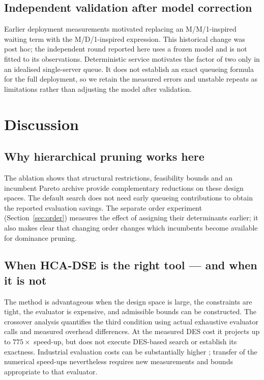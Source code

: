 \documentclass[preprint,11pt,3p]{elsarticle}
\theoremstyle{plain}
\theoremstyle{definition}
\newcommand{\ProjectionMax}{775}
\begin{document}
\FloatBarrier

\subsection{Independent validation after model correction}
Earlier deployment measurements motivated replacing an M/M/1-inspired waiting term
with the M/D/1-inspired expression. This historical change was post hoc; the independent
round reported here uses a frozen model and is not fitted to its observations.
Deterministic service motivates the factor of two only in an idealised single-server
queue. It does not establish an exact queueing formula for the full deployment, so we
retain the measured errors and unstable repeats as limitations rather than adjusting
the model after validation.
\section{Discussion}
\label{sec:discussion}

\subsection{Why hierarchical pruning works here}
The ablation shows that structural restrictions, feasibility bounds and an incumbent
Pareto archive provide complementary reductions on these design spaces. The default
search does not need early queueing contributions to obtain the reported evaluation
savings. The separate order experiment (Section~\ref{sec:order}) measures the effect of
assigning their determinants earlier; it also makes clear that changing order changes
which incumbents become available for dominance pruning.

\subsection{When HCA-DSE is the right tool --- and when it is not}
The method is advantageous when the design space is large, the constraints are tight, the
evaluator is expensive, and admissible bounds can be constructed. The crossover analysis quantifies the third condition using actual exhaustive evaluator
calls and measured overhead differences. At the measured DES cost it projects up to
$\ProjectionMax\times$ speed-up, but does not execute DES-based search or establish
its exactness. Industrial evaluation costs can be substantially higher
\cite{saadatmand2025compdse}; transfer of the numerical speed-ups nevertheless requires
new measurements and bounds appropriate to that evaluator.
\end{document}
